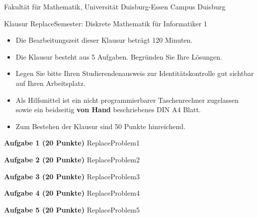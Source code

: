 \documentclass{article}
\begin{document}
Fakultät für Mathematik, Universität Duisburg-Essen Campus Duisburg\\

\begin{center}
\huge{
Klausur ReplaceSemester: Diskrete Mathematik für Informatiker 1} \\[2em]                                       \end{center}
\large

\begin{itemize}
\item Die Bearbeitungszeit dieser Klausur betr\"agt 120 Minuten.
\item Die Klausur besteht aus 5 Aufgaben. Begründen Sie Ihre Lösungen.
\item Legen Sie bitte Ihren Studierendenausweis zur Identit\"atskontrolle gut sichtbar
auf Ihren Arbeitsplatz.
\item  Als Hilfsmittel ist ein nicht programmierbarer Taschenrechner zugelassen sowie ein beidseitig \textbf{von Hand} beschriebenes DIN A4 Blatt.
\item  Zum Bestehen der Klausur sind 50 Punkte hinreichend.\\[1em]
\end{itemize}

\vspace{3em}

{\bf Aufgabe 1 (20 Punkte)} 
ReplaceProblem1

\vspace{2em}


{\bf Aufgabe 2 (20 Punkte)} 
ReplaceProblem2


\vspace{2em}
  
{\bf Aufgabe 3 (20 Punkte)} 
ReplaceProblem3

\vspace{2em}

{\bf Aufgabe 4 (20 Punkte)} 
ReplaceProblem4

 

\vspace{2em}

{\bf Aufgabe 5 (20 Punkte)} 
ReplaceProblem5


 
\end{document}
